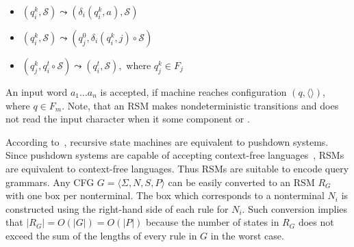 \begin{itemize}
    \item $(q_i^k,\mathcal{S}) \leadsto (\delta_i (q_i^k, a),\mathcal{S})$
    \item $(q_i^k,\mathcal{S}) \leadsto (q_j^0, \delta_i (q_i^k, j) \circ\mathcal{S})$
    \item $(q_j^k,q_i^t\circ \mathcal{S}) \leadsto (q_i^t, \mathcal{S}),$ where $q_j^k \in F_j$
\end{itemize}

An input word $a_1 \dots a_n$ is accepted, if machine reaches configuration $(q,\langle\rangle)$, where $q \in F_m$.
Note, that an RSM makes nondeterministic transitions and does not read the input character when it  some component or .

According to~\cite{rsm:analysis:10.1007/3-540-44585-4_18}, recursive state machines are equivalent to pushdown systems.
Since pushdown systems are capable of accepting context-free languages~\citep{automata:theory:10.5555/1177300}, RSMs are equivalent to context-free languages.
Thus RSMs are suitable to encode query grammars.
Any CFG $G=\langle\Sigma, N, S, P\rangle$ can be easily converted to an RSM $R_G$ with one box per nonterminal.
The box which corresponds to a nonterminal $N_i$ is constructed using the right-hand side of each rule for $N_i$.
Such conversion implies that $|R_G| = O(|G|) = O(|P|)$ because the number of states in $R_G$ does not exceed the sum of the lengths of every rule in $G$ in the worst case.

